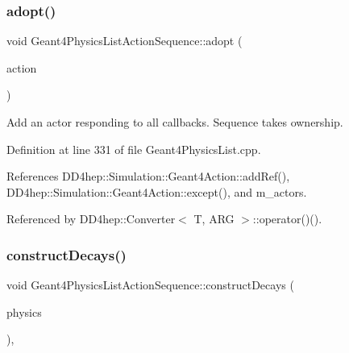 \subsubsection{\texorpdfstring{adopt()}{adopt()}}
{\footnotesize\ttfamily void Geant4\+Physics\+List\+Action\+Sequence\+::adopt (\begin{DoxyParamCaption}\item[{\hyperlink{class_d_d4hep_1_1_simulation_1_1_geant4_physics_list}{Geant4\+Physics\+List} $\ast$}]{action }\end{DoxyParamCaption})}



Add an actor responding to all callbacks. Sequence takes ownership. 



Definition at line 331 of file Geant4\+Physics\+List.\+cpp.



References D\+D4hep\+::\+Simulation\+::\+Geant4\+Action\+::add\+Ref(), D\+D4hep\+::\+Simulation\+::\+Geant4\+Action\+::except(), and m\+\_\+actors.



Referenced by D\+D4hep\+::\+Converter$<$ T, A\+R\+G $>$\+::operator()().

\hypertarget{class_d_d4hep_1_1_simulation_1_1_geant4_physics_list_action_sequence_ad87f044fc81f3ac371ad5396dcb21d53}{}\label{class_d_d4hep_1_1_simulation_1_1_geant4_physics_list_action_sequence_ad87f044fc81f3ac371ad5396dcb21d53} 
\subsubsection{\texorpdfstring{construct\+Decays()}{constructDecays()}}
{\footnotesize\ttfamily void Geant4\+Physics\+List\+Action\+Sequence\+::construct\+Decays (\begin{DoxyParamCaption}\item[{G4\+V\+User\+Physics\+List $\ast$}]{physics }\end{DoxyParamCaption})\hspace{0.3cm}{\ttfamily [protected]}, {\ttfamily [virtual]}}



